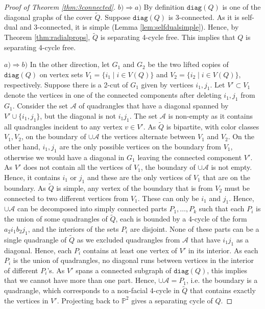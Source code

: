 \documentclass{article}
\newcommand{\Pb}[0]{\mathbb{P}}
\newcommand{\diag}[0]{\mathtt{diag}}
\begin{document}
\begin{proof}[Proof of Theorem \ref{thm:3connected}]
   $b)\Rightarrow a)$  By definition $\diag(Q)$ is one of the diagonal graphs of the cover $\widetilde Q$. Suppose $\diag(Q)$ is 3-connected. As it is self-dual and 3-connected, it is simple (Lemma \ref{lem:selfdualsimple}). Hence, by Theorem \ref{thm:radialprops}, $\widetilde{Q}$ is separating 4-cycle free. This implies that $Q$ is separating 4-cycle free. 



    $a)\Rightarrow b)$ In the other direction, let $G_1$ and $G_2$ be the two lifted copies of $\diag(Q)$ on vertex sets $V_1=\{i_1\mid i\in V(Q)\}$ and $V_2=\{i_2\mid i\in V(Q)\}$, respectively. Suppose there is a 2-cut of $G_1$ given by vertices $i_1,j_1$. Let $V'\subset V_1$ denote the vertices in one of the connected components after deleting $i_1,j_1$ from $G_1$. Consider the set $\mathcal A$ of quadrangles that have a diagonal spanned by $V'\cup\{i_1,j_1\}$, but the diagonal is not $i_1j_1$. The set $\mathcal{A}$ is non-empty as it contains all quadrangles incident to any vertex $v\in V'$. As $\widetilde Q$ is bipartite, with color classes $V_1,V_2$, on the boundary of $\cup \mathcal A$ the vertices alternate between $V_1$ and $V_2$. On the other hand, $i_1,j_1$ are the only possible vertices on the boundary from $V_1$, otherwise we would have a diagonal in $G_1$ leaving the connected component $V'$. As $V'$ does not contain all the vertices of $V_1$, the boundary of $\cup\mathcal A$ is not empty. Hence, it contains $i_1$ or $j_1$ and these are the only vertices of $V_1$ that are on the boundary. As $\widetilde Q$ is simple, any vertex of the boundary that is from $V_2$ must be connected to two different vertices from $V_1$. These can only be $i_1$ and $j_1$. Hence, $\cup \mathcal A$ can be decomposed into simply connected parts $P_1,\dots, P_k$ such that each $P_i$ is the union of some quadrangles of $\widetilde Q$, each is bounded by a 4-cycle of the form $a_2i_1b_2j_1$, and the interiors of the sets $P_i$ are disjoint. None of these parts can be a single quadrangle of $\widetilde Q$ as we excluded quadrangles from $\mathcal A$ that have $i_1j_1$ as a diagonal. Hence, each $P_i$ contains at least one vertex of $V'$ in its interior. As each $P_i$ is the union of quadrangles, no diagonal runs between vertices in the interior of different $P_i$'s. As $V'$ spans a connected subgraph of $\diag(Q)$, this implies that we cannot have more than one part. Hence, $\cup\mathcal A=P_1$, i.e. the boundary is a quadrangle, which corresponds to a non-facial 4-cycle in $\widetilde Q$ that contains exactly the vertices in $V'$. Projecting back to $\Pb^2$ gives a separating cycle of $Q$.


\end{proof}
\end{document}
